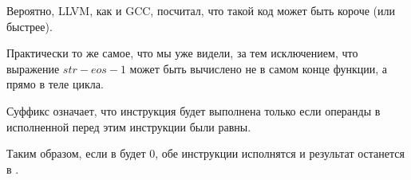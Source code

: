 Вероятно, LLVM, как и GCC, посчитал, что такой код может быть короче (или быстрее).

\mysubparagraph{\OptimizingKeilVI (\ARMMode)}



Практически то же самое, что мы уже видели, за тем исключением, что выражение $str - eos - 1$ 
может быть вычислено не в самом конце функции, а прямо в теле цикла.

Суффикс  означает, что инструкция будет выполнена только
если операнды в исполненной перед этим инструкции \CMP были равны.

Таким образом, если в  будет 0,
обе инструкции  исполнятся и результат останется в .

